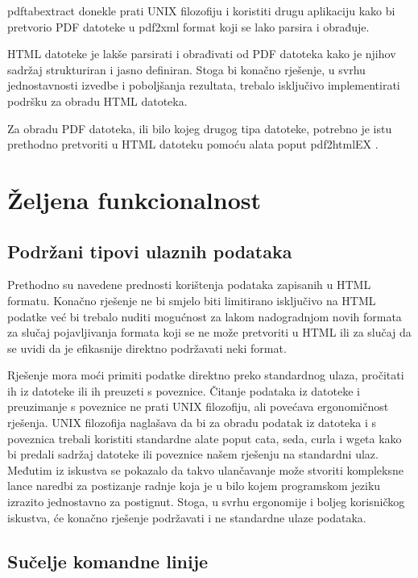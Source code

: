 \documentclass[times, utf8, zavrsni]{fer}
\begin{document}
pdftabextract donekle prati UNIX filozofiju i koristiti drugu aplikaciju kako bi
pretvorio PDF datoteke u pdf2xml format koji se lako parsira i obrađuje.

HTML datoteke je lakše parsirati i obrađivati od PDF datoteka kako je njihov
sadržaj strukturiran i jasno definiran.
Stoga bi konačno rješenje, u svrhu
jednostavnosti izvedbe i poboljšanja rezultata, trebalo isključivo
implementirati podršku za obradu HTML datoteka.

Za obradu PDF datoteka, ili bilo kojeg drugog tipa datoteke,
potrebno je istu prethodno pretvoriti u HTML datoteku pomoću alata poput
pdf2htmlEX \cite{pdf2htmlex_repository}.

\section{Željena funkcionalnost}

\subsection{Podržani tipovi ulaznih podataka}

Prethodno su navedene prednosti korištenja podataka zapisanih u HTML formatu.
Konačno rješenje ne bi smjelo biti limitirano isključivo na HTML podatke već
bi trebalo nuditi mogućnost za lakom nadogradnjom novih formata za slučaj
pojavljivanja formata koji se ne može pretvoriti u HTML ili za slučaj da se
uvidi da je efikasnije direktno podržavati neki format.

Rješenje mora moći primiti podatke direktno preko standardnog ulaza, pročitati
ih iz datoteke ili ih preuzeti s poveznice. Čitanje podataka iz datoteke i
preuzimanje s poveznice ne prati UNIX filozofiju, ali povećava ergonomičnost
rješenja. UNIX filozofija naglašava da bi za obradu podatak iz datoteka i s
poveznica trebali koristiti standardne alate poput cata, seda, curla i wgeta
kako bi predali sadržaj datoteke ili poveznice našem rješenju na standardni
ulaz. Međutim iz iskustva se pokazalo da takvo ulančavanje može stvoriti
kompleksne lance naredbi za postizanje radnje koja je u bilo kojem programskom
jeziku izrazito jednostavno za postignut. Stoga, u svrhu ergonomije i boljeg
korisničkog iskustva, će konačno rješenje podržavati i ne standardne ulaze
podataka.

\subsection{Sučelje komandne linije}
\end{document}
